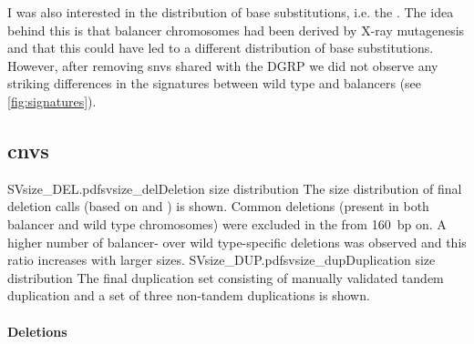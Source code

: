 I was also interested in the distribution of base substitutions, i.e.
the . The idea behind this is that
balancer chromosomes had been derived by X-ray mutagenesis and that this
could have led to a different distribution of base substitutions. However, after
removing \acp{snv} shared with the DGRP we did not observe any striking
differences in the \snv signatures between wild type and balancers (see
\cref{fig:signatures}).



\subsection{\texorpdfstring{\Aclp{cnv}}{Copy number variants}}
\label{sec:balancer_cnv}

\figuretwocolumns
    {SVsize_DEL.pdf}{svsize_del}{Deletion size distribution}
    {The size distribution of final deletion calls (based on \delly and
    \freebayes) is shown. Common deletions (present in both balancer and wild
    type chromosomes) were excluded in the from 160~bp on. A higher number of
     balancer- over wild type-specific deletions was observed and this ratio
     increases with larger sizes.}
    {SVsize_DUP.pdf}{svsize_dup}{Duplication size distribution}
    {The final duplication set consisting of manually validated tandem
    duplication and a set of three non-tandem duplications is shown.}


\paragraph{Deletions}

